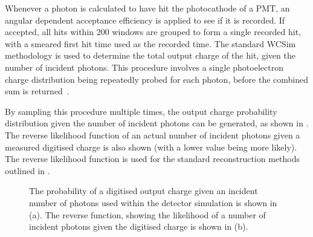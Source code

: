 Whenever a photon is calculated to have hit the photocathode of a PMT, an angular dependent
acceptance efficiency is applied to see if it is recorded. If accepted, all hits within
\SI{200}{} windows are grouped to form a single recorded hit, with a smeared first hit
time used as the recorded time. The standard WCSim methodology is used to determine the total
output charge of the hit, given the number of incident photons. This procedure involves a single
photoelectron charge distribution being repeatedly probed for each photon, before the combined sum
is returned~\cite{tutorial2020}.

By sampling this procedure multiple times, the output charge probability distribution given the
number of incident photons can be generated, as shown in . The reverse
likelihood function of an actual number of incident photons given a measured digitised charge is
also shown (with a lower value being more likely). The reverse likelihood function is used for the
standard reconstruction methods outlined in .

\begin{figure} %
    \centering
    \quad
    \caption[Detector simulation PMT digitisation function]
    {The probability of a digitised output charge given an incident number of photons used within
    the detector simulation is shown in (a). The reverse function, showing the likelihood of a
    number of incident photons given the digitised charge is shown in (b).}
    \label{fig:digitisation}
\end{figure}

